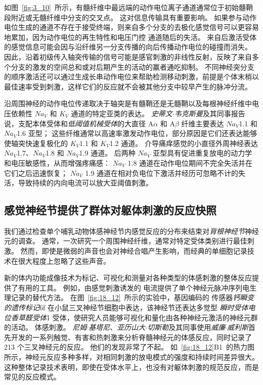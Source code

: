 如图~\ref{fig:3_10}~所示，有髓纤维中最远端的动作电位离子通道通常位于初始髓鞘段附近或无髓纤维中分支的交叉点。
这对信息传输具有重要影响。
如果参与动作电位生成的通道不存在于接受终端，则来自多个分支的去极化感觉信号可以更容易地累加，因为动作电位的再生特性和电压门控  通道随后的失活。
来自后激活受体的感觉信息可能会因与沿纤维另一分支传播的向后传播动作电位的碰撞而消失。
因此，沿着初级传入轴突传输的信号可能是感官刺激的非线性反射，反映了来自多个分支的激发的空间总和或对后期产生的活动的赢者通吃抑制。
不同神经突分支的顺序激活还可以通过生成长串动作电位来帮助检测移动刺激，前提是个体末梢以最佳速率受到刺激，这样它们的反应就不会被其他分支中较早产生的脉冲分流。



沿周围神经的动作电位传递取决于轴突是有髓鞘还是无髓鞘以及每根神经纤维中电压依赖性 $Na_V$ 和 $K_V$ 通道的特定亚类的表达。
\textit{史蒂文$\cdot$韦克斯曼}及其同事报告说，支配本体受体和\textit{低阈值机械受体}的大直径 A$\alpha$ 和 A$\beta$ 纤维主要表达 $Na_V$1.1 和 $Na_V$1.6 亚型；
这些纤维通常以高速率激发动作电位，部分原因是它们还表达能够使轴突快速复极化的 $K_V$1.1 和 $K_V$1.2 通道。
介导痛痒感觉的小直径外周神经表达 $Na_V$1.7、$Na_V$1.8 和 $Na_V$1.9 通道。
后两种 $Na_V$ 亚型具有促进重复放电的动力学和电压敏感性，从而增强疼痛感：
$Na_V$ 1.8 通道在动作电位期间不完全失活并在它们之后迅速恢复； 
$Na_V$ 1.9 通道在相对负电位下激活并经历可忽略不计的失活，导致持续的内向电流可以放大亚阈值刺激。



\subsection{感觉神经节提供了群体对躯体刺激的反应快照}

我们通过检查单个哺乳动物体感神经节内感觉反应的分布来结束对\textit{背根神经节}神经元的调查。
通常，一次研究一个周围神经纤维，通常对特定受体类别进行最佳刺激。
然而，即使是微弱的声音也会对神经合唱产生影响，而经典的单细胞记录技术在很大程度上忽略了这些声音。


新的体内功能成像技术为标记、可视化和测量对各种类型的体感刺激的整体反应提供了有用的工具。
例如，由感觉刺激诱发的  电流提供了单个神经元脉冲序列电生理记录的替代方法。
在图~\ref{fig:18_12}~所示的实验中，基因编码的  传感器\textit{钙瞬变的遗传标记}6f 在小鼠三叉神经节细胞中表达，该神经节还表达多觉型 \textit{瞬时受体电位香草醛受体}1 受体，使研究人员能够可视化和量化由各种神经元激活的神经元群的活动。 体感刺激。
\textit{尼姆$\cdot$基塔尼}、\textit{亚历山大$\cdot$切斯勒}及其同事使用\textit{威廉$\cdot$威利斯}首先开发的一系列触觉、有害和热刺激来分析脊髓神经元的体感反应，同时记录了 213 个三叉神经元的反应。
他们的发现非常了不起。
如~\ref{fig:18_12}B1~的热力图所示，神经元反应多种多样，对相同刺激的放电模式的强度和持续时间差异很大。
这种整体记录技术表明，即使在受体水平上，也没有对躯体刺激的规范反应，而是常见的反应模式。

